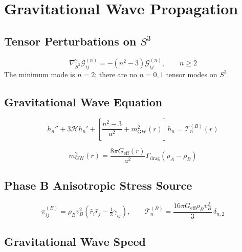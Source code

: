 \documentclass[10pt,twocolumn]{article}
\theoremstyle{definition}
\newcommand{\rhoA}{\rho_{A}}
\newcommand{\rhoB}{\rho_{B}}
\newcommand{\Hcal}{\mathcal{H}}
\newcommand{\Geff}{G_{\mathrm{eff}}}
\newcommand{\Gammadrag}{\Gamma_{\mathrm{drag}}}
\begin{document}
\section{Gravitational Wave Propagation}
\label{sec:gw}

\subsection{Tensor Perturbations on \( S^{3} \)}

\begin{equation}
  \nabla^{2}_{S^{3}}\mathcal{G}^{(n)}_{ij}
    = -(n^{2}-3)\mathcal{G}^{(n)}_{ij},
  \qquad n\geq2
\end{equation}
The minimum mode is \( n=2 \); there are no \( n=0,1 \) tensor
modes on \( S^{3} \).

\subsection{Gravitational Wave Equation}

\begin{equation}
  h_{n}''+3\Hcal h_{n}'+\left[
    \frac{n^{2}-3}{a^{2}}+m_{\mathrm{GW}}^{2}(r)
  \right]h_{n} = \mathcal{T}_{n}^{(B)}(r)
  \label{eq:GW-eq}
\end{equation}

\begin{equation}
  m_{\mathrm{GW}}^{2}(r)
    = \frac{8\pi\Geff(r)}{a^{2}}
      \Gammadrag(\rhoA-\rhoB)
  \label{eq:mGW}
\end{equation}%


\subsection{Phase B Anisotropic Stress Source}


\begin{equation}
  \pi^{(B)}_{ij}
    = \rhoB v_{B}^{2}
      \!\left(\hat{r}_{i}\hat{r}_{j}
             -\tfrac{1}{3}\gamma_{ij}\right),
    \qquad
    \mathcal{T}_{n}^{(B)}
    = \frac{16\pi\Geff\rhoB v_{B}^{2}}{3}\,\delta_{n,2}
  \label{eq:T-B-GW}
\end{equation}


\subsection{Gravitational Wave Speed}
\end{document}
